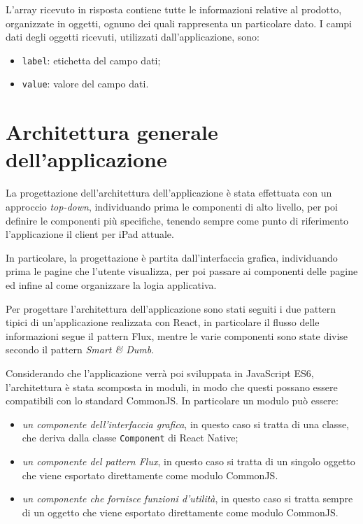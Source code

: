 L'array ricevuto in risposta contiene tutte le informazioni relative al prodotto, organizzate in oggetti, ognuno dei quali rappresenta un particolare dato. 
I campi dati degli oggetti ricevuti, utilizzati dall'applicazione, sono:
\begin{itemize}
\item \texttt{label}: etichetta del campo dati;
\item \texttt{value}: valore del campo dati.
\end{itemize}

\section{Architettura generale dell'applicazione}

La progettazione dell'architettura dell'applicazione è stata effettuata con un approccio \textit{top-down}, individuando prima le componenti di alto livello, per poi definire le componenti più specifiche, tenendo sempre come punto di riferimento l'applicazione il client per iPad attuale.

In particolare, la progettazione è partita dall'interfaccia grafica, individuando prima le pagine che l'utente visualizza, per poi passare ai componenti delle pagine ed infine al come organizzare la logia applicativa.

Per progettare l'architettura dell'applicazione sono stati seguiti i due pattern tipici di un'applicazione realizzata con React, in particolare il flusso delle informazioni segue il pattern Flux, mentre le varie componenti sono state divise secondo il pattern \textit{Smart \& Dumb}.

Considerando che l'applicazione verrà poi sviluppata in JavaScript ES6, l'architettura è stata scomposta in moduli, in modo che questi possano essere compatibili con lo standard CommonJS.
In particolare un modulo può essere:
\begin{itemize}
\item \textit{un componente dell'interfaccia grafica}, in questo caso si tratta di una classe, che deriva dalla classe \texttt{Component} di React Native;
\item \textit{un componente del pattern Flux}, in questo caso si tratta di un singolo oggetto che viene esportato direttamente come modulo CommonJS.
\item \textit{un componente che fornisce funzioni d'utilità}, in questo caso si tratta sempre di un oggetto che viene esportato direttamente come modulo CommonJS.
\end{itemize}

